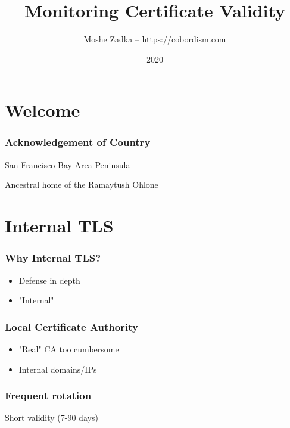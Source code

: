 \usepackage{hyperref}
\usepackage{graphicx}
\usepackage{listings}
\usepackage{textcomp}
\usepackage{fancyvrb}

\title{Monitoring Certificate Validity}
\author{Moshe Zadka -- https://cobordism.com}
\date{2020}


\begin{titlepage}
\maketitle
\end{titlepage}

\section{Welcome}

\frame{\titlepage}

\begin{frame}
\frametitle{Acknowledgement of Country}

San Francisco Bay Area Peninsula

Ancestral home of the Ramaytush Ohlone

\end{frame}

\section{Internal TLS}

\begin{frame}
\frametitle{Why Internal TLS?}

\begin{itemize}
\item Defense in depth
\item "Internal"
\end{itemize}

\end{frame}

\begin{frame}
\frametitle{Local Certificate Authority}

\begin{itemize}
\item "Real" CA too cumbersome
\item Internal domains/IPs
\end{itemize}

\end{frame}

\begin{frame}
\frametitle{Frequent rotation}

Short validity (7-90 days)

\end{frame}

